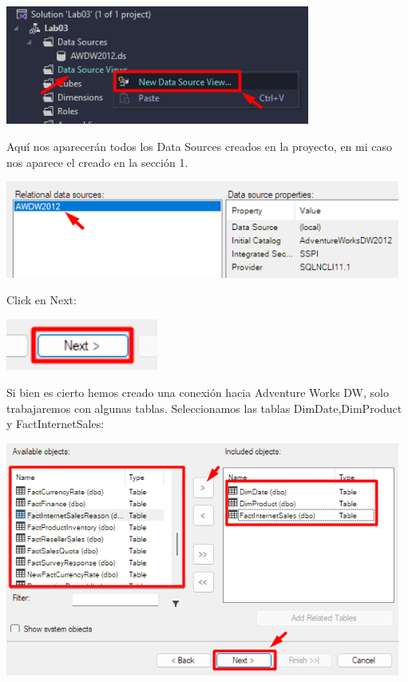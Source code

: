 \documentclass[12pt,letterpaper]{article}
\begin{document}
\begin{center}
    \includegraphics[width=10cm]{./img/img6.png}
\end{center}

Aquí nos aparecerán todos los Data Sources creados en la proyecto, en mi caso nos aparece el creado en la sección 1.

\begin{center}
    \includegraphics[width=13cm]{./img/img7.png}
\end{center}

Click en Next:

\begin{center}
    \includegraphics[width=5cm]{./img/img8.png}
\end{center}

Si bien es cierto hemos creado una conexión hacia Adventure Works DW, solo trabajaremos con algunas tablas. Seleccionamos las tablas DimDate,DimProduct y FactInternetSales:

\begin{center}
    \includegraphics[width=13cm]{./img/img9.png}
\end{center}
\end{document}
